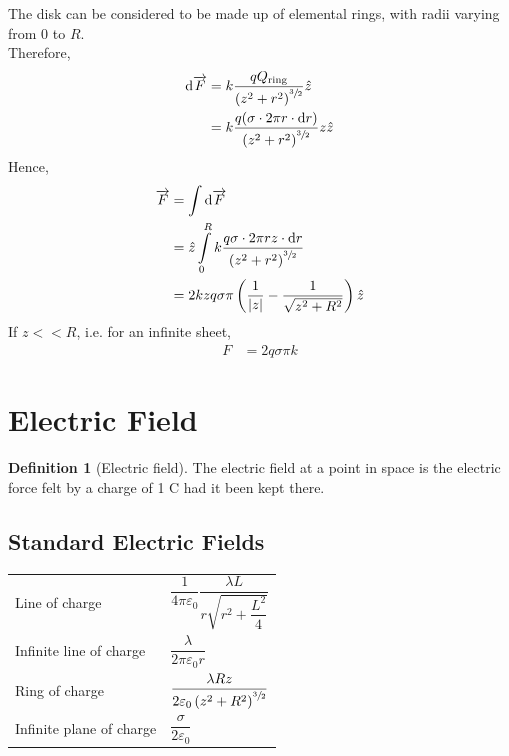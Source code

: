 \documentclass[fleqn, a4paper, 12pt, twoside]{article}
\theoremstyle{definition}
\newtheorem{definition}{Definition}
\theoremstyle{theorem}
\begin{document}
\begin{solution}
	The disk can be considered to be made up of elemental rings, with radii varying from $0$ to $R$.\\
	Therefore,
	\begin{align*}
		\dif \overrightarrow{F} &= k \dfrac{q Q_{\textnormal{ring}}}{\left( z^2 + r^2 \right)^{\sfrac{3}{2}}} \hat{z}\\
		&= k \dfrac{q (\sigma \cdot 2 \pi r \cdot \dif r)}{\left( z^2 + r^2 \right)^{\sfrac{3}{2}}} z \hat{z}
	\end{align*}
	Hence,
	\begin{align*}
		\overrightarrow{F} &= \int \dif\overrightarrow{F}\\
		&= \hat{z} \int\limits_{0}^{R} k \dfrac{q \sigma \cdot 2 \pi r z \cdot \dif r}{\left( z^2 + r^2 \right)^{\sfrac{3}{2}}}\\
		&= 2 k z q \sigma \pi \left( \dfrac{1}{|z|} - \dfrac{1}{\sqrt{z^2 + R^2}} \right)\hat{z}
	\end{align*}
	If $z << R$, i.e. for an infinite sheet,
	\begin{align*}
		F &= 2 q \sigma \pi k 
	\end{align*}
\end{solution}

\section{Electric Field}

\begin{definition}[Electric field]
	The electric field at a point in space is the electric force felt by a charge of 1 \si{\coulomb} had it been kept there.
\end{definition}

\subsection{Standard Electric Fields}

\begin{tabular}{l l}
	Line of charge & $\dfrac{1}{4 \pi \varepsilon_0} \dfrac{\lambda L}{r \sqrt{r^2 + \dfrac{L^2}{4}}}$\\
	Infinite line of charge & $\dfrac{\lambda}{2 \pi \varepsilon_0 r}$\\
	Ring of charge & $\dfrac{\lambda R z}{2 \varepsilon_0 \left( z^2 + R^2 \right)^{\sfrac{3}{2}}}$\\
	Infinite plane of charge & $\dfrac{\sigma}{2 \varepsilon_0}$
\end{tabular}
\end{document}
